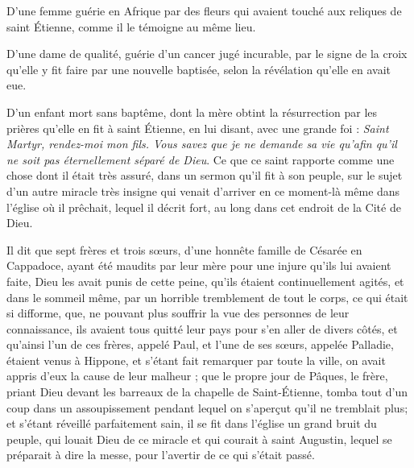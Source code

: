 D'une femme guérie en Afrique par des fleurs qui avaient touché aux reliques de saint Étienne, comme il le témoigne au même lieu.

D'une dame de qualité, guérie d'un cancer jugé incurable, par le signe de la croix qu'elle y fit faire par une nouvelle baptisée, selon la révélation qu'elle en avait eue.

D'un enfant mort sans baptême, dont la mère obtint la résurrection par les prières qu'elle en fit à saint Étienne, en lui disant, avec une grande foi : \emph{Saint Martyr, rendez-moi mon fils. Vous savez que je ne demande sa vie qu'afin qu'il ne soit pas éternellement séparé de Dieu}. Ce que ce saint rapporte comme une chose dont il était très assuré, dans un sermon qu'il fit à son peuple, sur le sujet d'un autre miracle très insigne qui venait d'arriver en ce moment-là même dans l'église où il prêchait, lequel il décrit fort, au long dans cet endroit de la Cité de Dieu.

Il dit que sept frères et trois sœurs, d'une honnête famille de Césarée en Cappadoce, ayant été maudits par leur mère pour une injure qu'ils lui avaient faite, Dieu les avait punis de cette peine, qu'ils étaient continuellement agités, et dans le sommeil même, par un horrible tremblement de tout le corps, ce qui était si difforme, que, ne pouvant plus souffrir la vue des personnes de leur connaissance, ils avaient tous quitté leur pays pour s'en aller de divers côtés, et qu'ainsi l'un de ces frères, appelé Paul, et l'une de ses sœurs, appelée Palladie, étaient venus à Hippone, et s'étant fait remarquer par toute la ville, on avait appris d'eux la cause de leur malheur ; que le propre jour de Pâques, le frère, priant Dieu devant les barreaux de la chapelle de Saint-Étienne, tomba tout d'un coup dans un assoupissement pendant lequel on s'aperçut qu'il ne tremblait plus; et s'étant réveillé parfaitement sain, il se fit dans l'église un grand bruit du peuple, qui louait Dieu de ce miracle et qui courait à saint Augustin, lequel se préparait à dire la messe, pour l'avertir de ce qui s'était passé.

